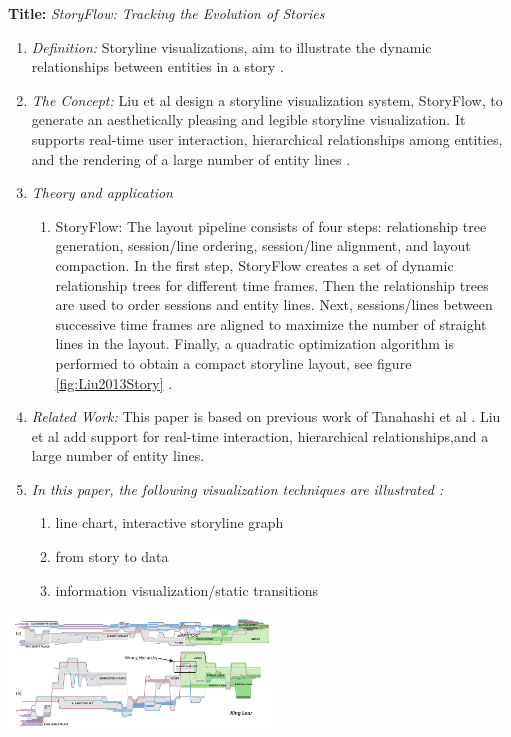\documentclass{egpubl}
\begin{document}
\textbf{Title:} \textit{StoryFlow: Tracking the Evolution of Stories}
\begin{enumerate}
\item \textit{Definition:} Storyline visualizations, aim to illustrate the dynamic relationships between entities in a story \cite{shixia}.
\item \textit{The Concept:} Liu et al design a storyline visualization system, StoryFlow, to generate an aesthetically pleasing and legible storyline visualization. It supports real-time user interaction, hierarchical relationships among entities, and the rendering of a large number of entity lines \cite{shixia}.
\item \textit{Theory and application}
\begin{enumerate}
\item StoryFlow: The layout pipeline consists of four steps: relationship tree generation, session/line ordering, session/line alignment, and layout compaction. In the first step, StoryFlow creates a set of dynamic relationship trees for different time frames. Then the relationship trees are used to order sessions and entity lines. Next, sessions/lines between successive time frames are aligned to maximize the number of straight lines in the layout. Finally, a quadratic optimization algorithm is performed to obtain a compact storyline layout, see figure \ref{fig:Liu2013Story} \cite{shixia}.
\end{enumerate}
\item \textit{Related Work:}  This paper is based on previous work of Tanahashi et al \cite{Tanahashi}. Liu et al add support for real-time interaction, hierarchical relationships,and a large number of entity lines. 
\item \textit{In this paper, the following visualization techniques are illustrated :} 
\begin{enumerate}
\item line chart, interactive storyline graph
\item from story to data
\item information visualization/static transitions
\end{enumerate}
\end{enumerate}


\begingroup
\centering
\includegraphics[width=7cm]{./images/Liu2013Story}
\label{fig:Liu2013Story}
\endgroup
\end{document}
